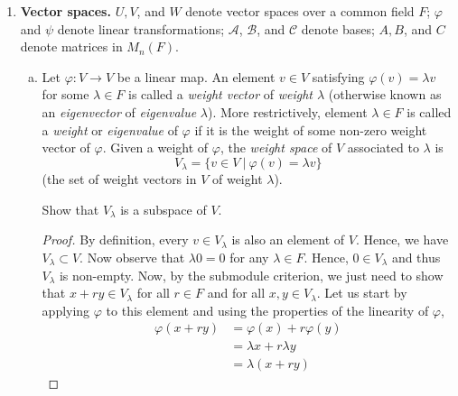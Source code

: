 \documentclass[11pt, reqno]{amsart}
\theoremstyle{plain}
\theoremstyle{definition}
\theoremstyle{example}
\def\cA{\mathcal{A}}\def\cB{\mathcal{B}}\def\cC{\mathcal{C}}\def\cD{\mathcal{D}}\def\cE{\mathcal{E}}\def\cF{\mathcal{F}}\def\cG{\mathcal{G}}\def\cH{\mathcal{H}}\def\cI{\mathcal{I}}\def\cJ{\mathcal{J}}\def\cK{\mathcal{K}}\def\cL{\mathcal{L}}\def\cM{\mathcal{M}}\def\cN{\mathcal{N}}\def\cO{\mathcal{O}}\def\cP{\mathcal{P}}\def\cQ{\mathcal{Q}}\def\cR{\mathcal{R}}\def\cS{\mathcal{S}}\def\cT{\mathcal{T}}\def\cU{\mathcal{U}}\def\cV{\mathcal{V}}\def\cW{\mathcal{W}}\def\cX{\mathcal{X}}\def\cY{\mathcal{Y}}\def\cZ{\mathcal{Z}}
\def\sgn{\mathrm{sgn}}
\def\f{\varphi}
\begin{document}
\begin{enumerate}[1.]
\begin{enumerate}[(a)]
\begin{enumerate}[(i)]
\begin{proof}

\end{proof}

\end{enumerate}
\item Let $F$ be a field with $n! \ne 0$ in $F$.\footnote{As usual, as an element of $F$, $n!$ means $1+ 1+ \cdots 1$ ($n!$ terms).} Show that 
$$e_+ = \sum_{\sigma \in S_n} \sigma \qquad \text{ and } \qquad e_- = \sum_{\sigma \in S_n} \sgn(\sigma) \sigma$$ are essential idempotents in $F S_n$ and are central, and compute the corresponding (pure) idempotents. {[\emph{Hint:} Do $e_+$ first, using the fact that any group acts transitively on itself by left multiplication. For $e_-$, do some small examples first, and modify your proof for $e_+$ appropriately.]}
\end{enumerate}

\item \textbf{Vector spaces.} $U, V$, and $W$ denote vector spaces over a common field $F$; $\f$ and $\psi$ denote linear transformations; $\cA$, $\cB$, and $\cC$ denote bases; $A, B$, and $C$ denote matrices in $M_n(F)$. 
\begin{enumerate}[(a)]
\item Let $\f:V \to V$ be a linear map. An element $v \in V$ satisfying $\f(v) = \lambda v$ for some $\lambda \in F$ is called a \emph{weight vector} of \emph{weight $\lambda$} (otherwise known as an \emph{eigenvector} of \emph{eigenvalue} $\lambda$). More restrictively, element $\lambda \in F$ is called a \emph{weight} or \emph{eigenvalue} of $\f$ if it is the weight of some non-zero weight vector of $\f$. Given a weight of $\f$, the \emph{weight space} of $V$ associated to $\lambda$ is 
$$V_\lambda = \{ v\in V ~|~ \f(v) = \lambda v\}$$
(the set of weight vectors in $V$ of weight $\lambda$). 

\medskip

Show that $V_\lambda$ is a subspace of $V$. 

\begin{proof}
By definition, every $v \in V_{\lambda}$ is also an element of $V$. Hence, we have $V_{\lambda} \subset V$. Now observe that $\lambda 0 = 0$ for any $\lambda \in F$. Hence, $0 \in V_{\lambda}$ and thus $V_\lambda$ is non-empty. Now, by the submodule criterion, we just need to show that $x + ry \in V_{\lambda}$ for all $r \in F$ and for all $x, y \in V_{\lambda}$. Let us start by applying $\varphi$ to this element and using the properties of the linearity of $\varphi$,
\begin{align*}
\varphi(x + ry) &= \varphi(x) + r\varphi(y)\\
&= \lambda x + r \lambda y\\
&= \lambda (x + ry)
\end{align*}


\end{proof}
\end{enumerate}
\end{enumerate}
\end{document}
